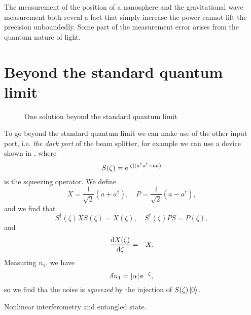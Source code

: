 \documentclass[hyperref, a4paper]{article}
\newcommand*{\ee}{\mathrm{e}}
\begin{document}
The measurement of the position of a nanosphere and the gravitational wave measurement both reveal a fact that simply increase the power cannot lift the precision unboundedly. 
Some part of the measurement error arises from the quantum nature of light.

\section{Beyond the standard quantum limit}

\begin{figure}
    \centering
    
    \caption{One solution beyond the standard quantum limit}
    \label{fig:beyond-sql}
\end{figure}

To go beyond the standard quantum limit we can make use of the other input port, i.e. \emph{the dark port} of the beam splitter, for example we can use a device shown in , where 
\begin{equation}
    S(\zeta) = \ee^{\abs*{\zeta} (a^\dagger a^\dagger - a a)}
\end{equation}
is the squeezing operator. We define
\begin{equation}
    X = \frac{1}{\sqrt{2}} (a + a^\dagger), \quad P = \frac{1}{\sqrt{2}} (a - a^\dagger),
\end{equation}
and we find that 
\begin{equation}
    S^\dagger(\zeta) X S(\zeta) = X(\zeta) , \quad S^\dagger(\zeta) P S = P(\zeta), 
\end{equation}
and 
\begin{equation}
    \dv{X(\zeta)}{\zeta} = - X.
\end{equation}
Measuring $n_1$, we have 
\begin{equation}
    \var{n}_1 = \abs*{\alpha} \ee^{-\zeta}, 
\end{equation}
so we find tha the noise is \emph{squeezed} by the injection of $S(\zeta) \ket*{0}$.

Nonlinear interferometry and entangled state.
\end{document}
